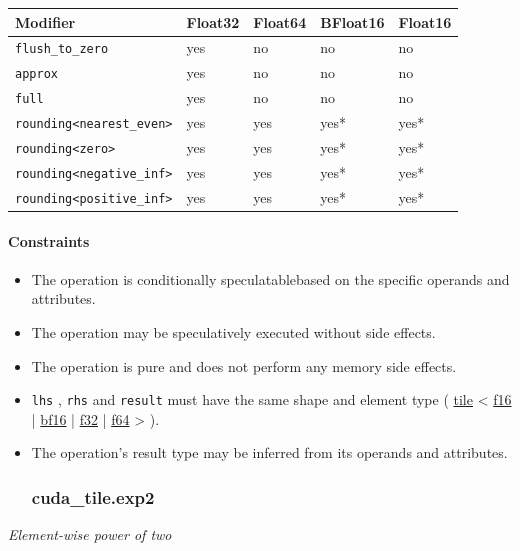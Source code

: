 \documentclass{article}
\begin{document}
\begin{longtable}{l|l|l|l|l}
\hline
Modifier & Float32 & Float64 & BFloat16 & Float16 \\ \hline
\texttt{flush\_to\_zero} & yes & no & no & no \\ \hline
\texttt{approx} & yes & no & no & no \\ \hline
\texttt{full} & yes & no & no & no \\ \hline
\texttt{rounding<nearest\_even>} & yes & yes & yes* & yes* \\ \hline
\texttt{rounding<zero>} & yes & yes & yes* & yes* \\ \hline
\texttt{rounding<negative\_inf>} & yes & yes & yes* & yes* \\ \hline
\texttt{rounding<positive\_inf>} & yes & yes & yes* & yes* \\ \hline
\end{longtable}


\paragraph{Constraints}

\begin{itemize}
\item The operation is conditionally speculatablebased on the specific operands and attributes.
\item The operation may be speculatively executed without side effects.
\item The operation is pure and does not perform any memory side effects.
\item \texttt{lhs} , \texttt{rhs} and \texttt{result} must have the same shape and element type ( \href{https://docs.nvidia.com/cuda/tile-ir/latest/sections/types.html#type-tile}{tile} < \href{https://docs.nvidia.com/cuda/tile-ir/latest/sections/types.html#subsection-element-types}{f16} | \href{https://docs.nvidia.com/cuda/tile-ir/latest/sections/types.html#subsection-element-types}{bf16} | \href{https://docs.nvidia.com/cuda/tile-ir/latest/sections/types.html#subsection-element-types}{f32} | \href{https://docs.nvidia.com/cuda/tile-ir/latest/sections/types.html#subsection-element-types}{f64} > ).
\item The operation's result type may be inferred from its operands and attributes.


\subsubsection{cuda\_tile.exp2}

\end{itemize}
\textit{Element-wise power of two}
\end{document}
